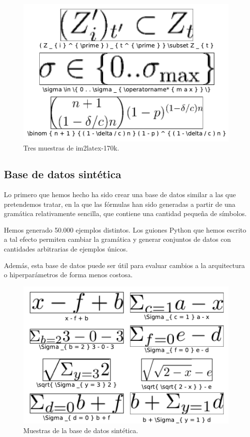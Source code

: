 \documentclass[a4paper, 20pt, dvipsnames]{article}
\begin{document}
\begin{figure}[H]
	\centering
	\includegraphics{fig/ejemplo-im2latex.pdf}
	\caption{Tres muestras de im2latex-170k.}
	\label{fig:muestras-1}
\end{figure}


\subsection{Base de datos sintética}

Lo primero que hemos hecho ha sido crear una base de datos similar a las que pretendemos tratar, en la que las fórmulas han sido generadas a partir de una gramática relativamente sencilla, que contiene una cantidad pequeña de símbolos.

Hemos generado 50.000 ejemplos distintos. Los guiones Python que hemos escrito a tal efecto permiten cambiar la gramática y generar conjuntos de datos con cantidades arbitrarias de ejemplos únicos.

Además, esta base de datos puede ser útil para evaluar cambios a la arquitectura o hiperparámetros de forma menos costosa.

\begin{figure}[H]
	\centering
	\includegraphics{fig/ejemplo-sintetica.pdf}
	\caption{Muestras de la base de datos sintética.}
	\label{fig:muestras-sintetica}
\end{figure}
\end{document}

